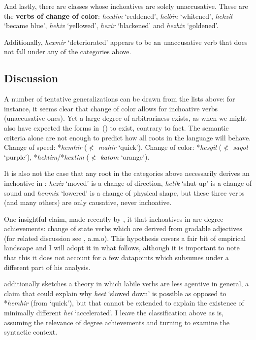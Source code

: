 And lastly, there are classes whose inchoatives are solely unaccusative. These are the \textbf{verbs of change of color}: \emph{heedim} `reddened', \emph{helbin} `whitened', \emph{hekxil} `became blue', \emph{he{\texttslig}hiv} `yellowed', \emph{hexir} `blackened' and \emph{hezhiv} `goldened'. %

Additionally, \emph{hexmir} `deteriorated' appears to be an unaccusative verb that does not fall under any of the categories above.

\subsection{Discussion}
A number of tentative generalizations can be drawn from the lists above: for instance, it seems clear that change of color allows for inchoative verbs (unaccusative ones). Yet a large degree of arbitrariness exists, as when we might also have expected the forms in~(\nextx) to exist, contrary to fact. The semantic criteria alone are not enough to predict how all roots in the language will behave.
\pex
	\a Change of speed:
		*\emph{hemhir} ($\nless$ \emph{mahir} `quick').
	\a Change of color:
		*\emph{hesgil} ($\nless$ \emph{sagol} `purple'), *\emph{hektim}/*\emph{hextim} ($\nless$ \emph{katom} `orange').
\xe

It is also not the case that any root in the categories above necessarily derives an inchoative in {\thif}: \emph{heziz} `moved' is a change of direction, \emph{hetik} `shut up' is a change of sound and \emph{henmix} `lowered' is a change of physical shape, but these three verbs (and many others) are only causative, never inchoative.

One insightful claim, made recently by \cite{lev16}, it that inchoatives in {\thif} are degree achievements: change of state verbs which are derived from gradable adjectives (for related discussion see \citealt{dowty91,hayetal99,rotsteinwinter04,kennedylevin08,bobaljik12}, a.m.o). This hypothesis covers a fair bit of empirical landscape and I will adopt it in what follows, although it is important to note that this it does not account for a few datapoints which \cite{lev16} subsumes under a different part of his analysis. 

\cite{lev16} additionally sketches a theory in which labile verbs are less agentive in general, a claim that could explain why \emph{heet} `slowed down' is possible as opposed to *\emph{hemhir} (from `quick'), but that cannot be extended to explain the existence of minimally different \emph{hei{\texttslig}} `accelerated'. I leave the classification above as is, assuming the relevance of degree achievements and turning to examine the syntactic context.

